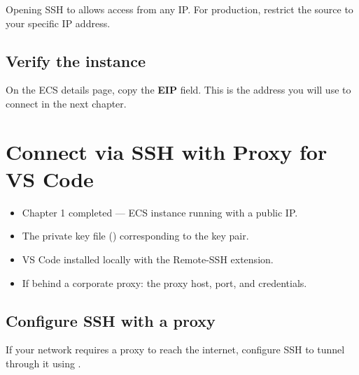 \documentclass[english]{guide}
\begin{document}
\begin{aviso}
Opening SSH to  allows access from any IP. For production,
restrict the source to your specific IP address.
\end{aviso}

\subsection{Verify the instance}

On the ECS details page, copy the \textbf{EIP} field. This is the address you
will use to connect in the next chapter.

\section{Connect via SSH with Proxy for VS Code}

\begin{objetivos}

  \prerequisitos
  \begin{itemize}
    \item Chapter 1 completed — ECS instance running with a public IP.
    \item The private key file () corresponding to the key pair.
    \item VS Code installed locally with the Remote-SSH extension.
    \item If behind a corporate proxy: the proxy host, port, and credentials.
  \end{itemize}
\end{objetivos}

\subsection{Configure SSH with a proxy}

If your network requires a proxy to reach the internet, configure SSH to
tunnel through it using .
\end{document}
